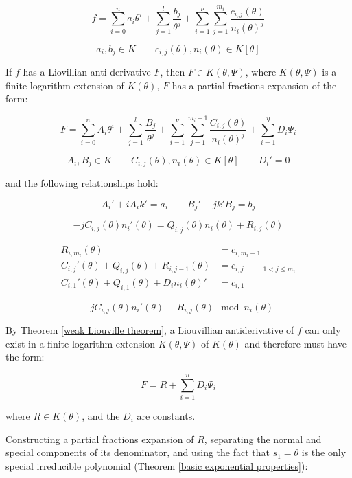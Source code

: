 $$f = \sum_{i=0}^n a_i \theta^i + \sum_{j=1}^{l} \frac{b_{j}}{\theta^j}
+ \sum_{i=1}^\nu \sum_{j=1}^{m_i} \frac{c_{i,j}(\theta)}{n_i(\theta)^j}$$

$$a_i, b_j \in K \qquad c_{i,j}(\theta),n_i(\theta) \in K[\theta]$$

If $f$ has
a Liovillian anti-derivative $F$, then $F \in K(\theta, \Psi)$,
where $K(\theta, \Psi)$ is a finite logarithm extension
of $K(\theta)$, $F$ has a partial fractions expansion of the form:

$$F = \sum_{i=0}^n A_i \theta^i + \sum_{j=1}^{l} \frac{B_{j}}{\theta^j}
+ \sum_{i=1}^\nu \sum_{j=1}^{m_i+1} \frac{C_{i,j}(\theta)}{n_i(\theta)^j}
+ \sum_{i=1}^\eta D_i \Psi_i$$

$$A_i, B_j \in K \qquad C_{i,j}(\theta),n_i(\theta) \in K[\theta] \qquad D_i' = 0$$

and the following relationships hold:

$$A_i' + i A_i k' = a_i  \qquad  B_{j}' - j k' B_{j} = b_j$$

$$-jC_{i,j}(\theta)n_i'(\theta) = Q_{i,j}(\theta) n_i(\theta) + R_{i,j}(\theta)$$

\begin{align*}
R_{i,m_i}(\theta) & = c_{i,m_i+1} \\
C_{i,j}'(\theta) + Q_{i,j}(\theta) + R_{i,j-1}(\theta) & = c_{i,j} \qquad {}_{1<j\le m_i}\\
C_{i,1}'(\theta) + Q_{i,1}(\theta) + D_i n_i(\theta)' & = c_{i,1}
\end{align*}

$$-jC_{i,j}(\theta)n_i'(\theta) \equiv R_{i,j}(\theta) \mod n_i(\theta)$$


\proof


By Theorem \ref{weak Liouville theorem}, a Liouvillian antiderivative
of $f$ can only exist in a finite logarithm extension $K(\theta, \Psi)$
of $K(\theta)$ and therefore must have the form:

$$F = R + \sum_{i=1}^n D_i \Psi_i$$

where $R \in K(\theta)$, and the $D_i$ are constants.

Constructing a partial fractions expansion of $R$,
separating the normal and special components of its denominator,
and using the fact that $s_1 = \theta$ is the only
special irreducible polynomial
(Theorem \ref{basic exponential properties}):

